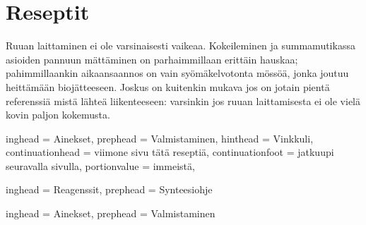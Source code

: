 \documentclass[../keittiokirja.tex]{subfiles}
\begin{document}
\chapter{Reseptit}
\label{chp:reseptit}

Ruuan laittaminen ei ole varsinaisesti vaikeaa. Kokeileminen ja summamutikassa asioiden pannuun mättäminen 
on parhaimmillaan erittäin hauskaa; pahimmillaankin aikaansaannos on vain syömäkelvotonta mössöä, jonka 
joutuu heittämään biojätteeseen. Joskus on kuitenkin mukava jos on jotain pientä referenssiä mistä 
lähteä liikenteeseen: varsinkin jos ruuan laittamisesta ei ole vielä kovin paljon kokemusta.


\setHeadlines
{%
    inghead = Ainekset,
    prephead = Valmistaminen,
    hinthead = Vinkkuli,
    continuationhead = viimone sivu tätä reseptiä,
    continuationfoot = jatkuupi seuravalla sivulla,
    portionvalue = immeistä,
}


\setHeadlines
{%
    inghead = Reagenssit,
    prephead = Synteesiohje
}

\newpage


\setHeadlines
{%
    inghead = Ainekset,
    prephead = Valmistaminen
}

\newpage


\newpage


\newpage



\newpage


\newpage


\newpage


\newpage


\newpage


\newpage

\end{document}
